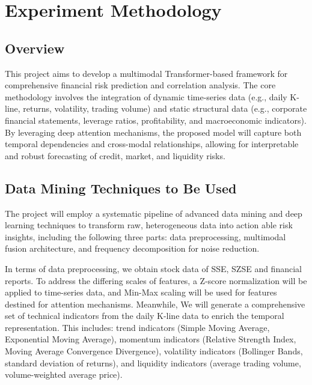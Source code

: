 \section{Experiment Methodology}
\label{sec:Experiment Methodology}
\subsection{Overview}
This project aims to develop a multimodal Transformer-based framework for comprehensive financial risk prediction and correlation analysis.
The core methodology involves the integration of dynamic time-series data (e.g., daily K-line, returns, volatility, trading volume) and static structural data (e.g., corporate financial statements, leverage ratios, profitability, and macroeconomic indicators).
By leveraging deep attention mechanisms, the proposed model will capture both temporal dependencies and cross-modal relationships, allowing for interpretable and robust forecasting of credit, market, and liquidity risks.

\subsection{Data Mining Techniques to Be Used}
The project will employ a systematic pipeline of advanced data mining and deep learning techniques to transform raw, heterogeneous data into action able risk insights, including the following three parts: data preprocessing, multimodal fusion architecture, and frequency decomposition for noise reduction.

In terms of data preprocessing, we obtain stock data of SSE, SZSE and financial reports. To address the differing scales of features, a Z-score normalization will be applied to time-series data, and Min-Max scaling will be used for features destined for attention mechanisms. Meanwhile, We will generate a comprehensive set of technical indicators from the daily K-line data to enrich the temporal representation. This includes: trend indicators (Simple Moving Average, Exponential Moving Average), momentum indicators (Relative Strength Index, Moving Average Convergence Divergence), volatility indicators (Bollinger Bands, standard deviation of returns), and liquidity indicators (average trading volume, volume-weighted average price).

